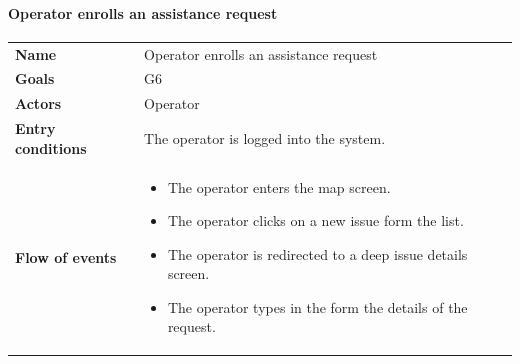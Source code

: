 \documentclass[]{article}
\providecommand{\tightlist}{%
  \setlength{\itemsep}{0pt}\setlength{\parskip}{0pt}}
\let\oldparagraph\paragraph
\renewcommand{\paragraph}[1]{\oldparagraph{#1}\mbox{}}
\begin{document}
\newpage

\paragraph{Operator enrolls an assistance
request}\label{operator-enrolls-an-assistance-request}

\begin{longtable}[]{@{}ll@{}}
\toprule
\begin{minipage}[t]{0.29\columnwidth}\raggedright\strut
\textbf{Name}\strut
\end{minipage} & \begin{minipage}[t]{0.65\columnwidth}\raggedright\strut
Operator enrolls an assistance request\strut
\end{minipage}\tabularnewline
\begin{minipage}[t]{0.29\columnwidth}\raggedright\strut
\textbf{Goals}\strut
\end{minipage} & \begin{minipage}[t]{0.65\columnwidth}\raggedright\strut
G6\strut
\end{minipage}\tabularnewline
\begin{minipage}[t]{0.29\columnwidth}\raggedright\strut
\textbf{Actors}\strut
\end{minipage} & \begin{minipage}[t]{0.65\columnwidth}\raggedright\strut
Operator\strut
\end{minipage}\tabularnewline
\begin{minipage}[t]{0.29\columnwidth}\raggedright\strut
\textbf{Entry conditions}\strut
\end{minipage} & \begin{minipage}[t]{0.65\columnwidth}\raggedright\strut
The operator is logged into the system.\strut
\end{minipage}\tabularnewline
\begin{minipage}[t]{0.29\columnwidth}\raggedright\strut
\textbf{Flow of events}\strut
\end{minipage} & \begin{minipage}[t]{0.65\columnwidth}\raggedright\strut
\begin{itemize}
\tightlist
\item
  The operator enters the map screen.
\item
  The operator clicks on a new issue form the list.
\item
  The operator is redirected to a deep issue details screen.
\item
  The operator types in the form the details of the request.

\end{itemize}
\end{minipage}
\end{longtable}
\end{document}
